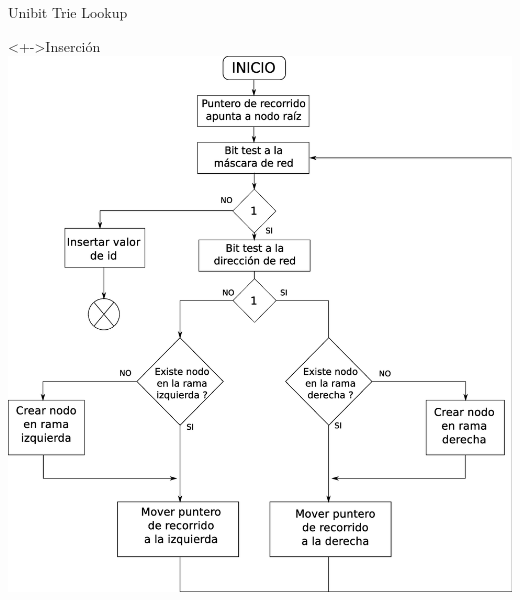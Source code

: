 \documentclass[xcolor=dvipsnames]{beamer}
\begin{document}
\begin{frame}{Unibit Trie Lookup}

\begin{block}<+->{Inserción}	
	\center	
	\includegraphics[scale=0.17]{figures/utlinsert.eps}  
\end{block}

\end{frame}
\end{document}
